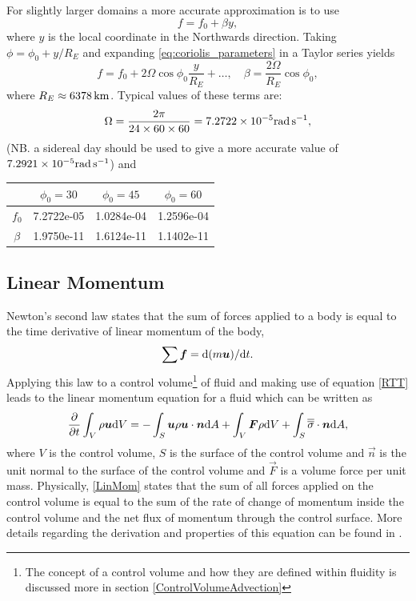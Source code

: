 For slightly larger domains a more accurate approximation is to use
\begin{equation}\label{eq:beta-plane}
f = f_0 + \beta y,
\end{equation}
where $y$ is the local coordinate in the Northwards direction.
Taking $\phi = \phi_0 + y/R_E$ and expanding \eqref{eq:coriolis_parameters}
in a Taylor series yields
\begin{equation*}
f = f_0 +2\Omega\cos\phi_0\frac{y}{R_E}+\ldots,\quad \beta = \frac{2\Omega}{R_E}\cos\phi_0,
\end{equation*}
where $R_E\approx\unit[6378]{km}$. Typical values of these terms are:
\begin{equation*}
\Omega = \frac{2\pi}{24\times 60\times 60} = 7.2722\times 10^{-5}\rads[],
\end{equation*}
(NB. a sidereal day should be used to give a more accurate value of $7.2921\times 10^{-5}\rads[]$)
and
\begin{center}\begin{small}
\begin{tabular}{c|ccc}
  &  $\phi_0 = 30$ & $\phi_0=45$ & $\phi_0 = 60$ \\  \hline
 $f_0$  & 7.2722e-05 & 1.0284e-04 & 1.2596e-04 \\
 $\beta$  & 1.9750e-11  &  1.6124e-11  &  1.1402e-11 \\
\end{tabular}\end{small}
\end{center}

\subsection{Linear Momentum}

Newton's second law states that the sum of forces applied to a body is equal to the time derivative of linear momentum of the body,
\begin{equation}\label{Newtons2nd}
 \sum {\mbox{\boldmath$f$}} = \mathrm{d}(m{\mbox{\boldmath$u$}})/\mathrm{d} t.
\end{equation}
Applying this law to a control volume\footnote{The concept of a control volume and how they are defined within fluidity is discussed more in section \ref{ControlVolumeAdvection}} of fluid and making use of equation \ref{RTT} leads to the linear momentum equation for a fluid which can be written as
\begin{equation}\label{LinMom}
 \frac{\partial}{\partial t}\int_{V}\rho{\mbox{\boldmath$u$}} \mathrm{d} V = -\int_{S} {\mbox{\boldmath$u$}} \rho {\mbox{\boldmath$u$}}\cdot{\mbox{\boldmath$n$}} \mathrm{d} A+\int_{V}{\mbox{\boldmath$F$}}\rho \mathrm{d} V
                                                      +\int_{S} \overline{\overline{\sigma}}\cdot{\mbox{\boldmath$n$}} \mathrm{d} A,
\end{equation}
where $V$ is the control volume, $S$ is the surface of the control volume and $\vec n$ is the unit normal to the surface of the control volume and $\vec F$ is a volume force per unit mass. Physically, \ref{LinMom} states that the sum of all forces applied on the control volume is equal to the sum of the rate of change of momentum inside the control volume and the net flux of momentum through the control surface. More details regarding the derivation and properties of this equation can be found in \citet{batchelor1967}.

